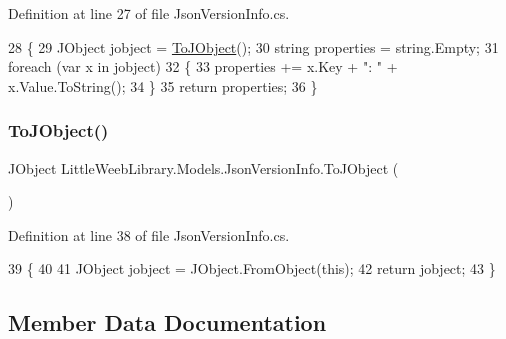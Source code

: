 Definition at line 27 of file Json\+Version\+Info.\+cs.


\begin{DoxyCode}
28         \{
29             JObject jobject = \mbox{\hyperlink{class_little_weeb_library_1_1_models_1_1_json_version_info_a08c6024e38bd3141ef69612e877c4406}{ToJObject}}();
30             \textcolor{keywordtype}{string} properties = \textcolor{keywordtype}{string}.Empty;
31             \textcolor{keywordflow}{foreach} (var x \textcolor{keywordflow}{in} jobject)
32             \{
33                 properties += x.Key + \textcolor{stringliteral}{": "} + x.Value.ToString();
34             \}
35             \textcolor{keywordflow}{return} properties;
36         \}
\end{DoxyCode}
\mbox{\label{class_little_weeb_library_1_1_models_1_1_json_version_info_a08c6024e38bd3141ef69612e877c4406}} 
\subsubsection{\texorpdfstring{To\+J\+Object()}{ToJObject()}}
{\footnotesize\ttfamily J\+Object Little\+Weeb\+Library.\+Models.\+Json\+Version\+Info.\+To\+J\+Object (\begin{DoxyParamCaption}{ }\end{DoxyParamCaption})}



Definition at line 38 of file Json\+Version\+Info.\+cs.


\begin{DoxyCode}
39         \{
40 
41             JObject jobject = JObject.FromObject(\textcolor{keyword}{this});
42             \textcolor{keywordflow}{return} jobject;
43         \}
\end{DoxyCode}


\subsection{Member Data Documentation}
\mbox{\label{class_little_weeb_library_1_1_models_1_1_json_version_info_a7a9fcfe7b1424766248cd523a28e48d0}} 
